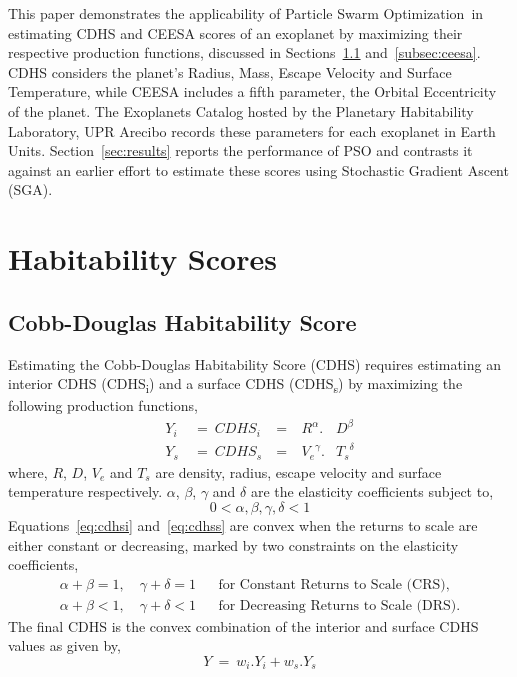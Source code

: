 \documentclass[10pt]{article}
\newcommand{\pso}{Particle Swarm Optimization}
\begin{document}
This paper demonstrates the applicability of \pso\ in estimating CDHS and CEESA scores of an exoplanet by maximizing
their respective production functions, discussed in Sections~\ref{subsec:cdhs} and~\ref{subsec:ceesa}. CDHS considers
the planet's Radius, Mass, Escape Velocity and Surface Temperature, while CEESA includes a fifth parameter, the Orbital
Eccentricity of the planet. The Exoplanets Catalog hosted by the Planetary Habitability Laboratory, UPR Arecibo records
these parameters for each exoplanet in Earth Units. Section~\ref{sec:results} reports the performance of PSO and
contrasts it against an earlier effort to estimate these scores using Stochastic Gradient Ascent (SGA).


\section{Habitability Scores}

\subsection{Cobb-Douglas Habitability Score}\label{subsec:cdhs}
Estimating the Cobb-Douglas Habitability Score (CDHS) requires estimating an interior CDHS (CDHS\textsubscript{i}) and a
surface CDHS (CDHS\textsubscript{s}) by maximizing the following production functions,
\begin{subequations}
  \begin{alignat}{4}
    Y_i\ &=\ {CDHS}_i\ &=&\ R^\alpha.&D^\beta\label{eq:cdhsi}\\
    Y_s\ &=\ {CDHS}_s\ &=&\ {V_e}^\gamma.&{T_s}^\delta\label{eq:cdhss}
  \end{alignat}
\end{subequations}
where, $R$, $D$, $V_e$ and $T_s$ are density, radius, escape velocity and surface temperature respectively. $\alpha$,
$\beta$, $\gamma$ and $\delta$ are the elasticity coefficients subject to,
\begin{equation}
  0 < \alpha,\beta,\gamma,\delta < 1
\end{equation}
Equations~\ref{eq:cdhsi} and~\ref{eq:cdhss} are convex when the returns to scale are either constant or decreasing,
marked by two constraints on the elasticity coefficients,
\begin{subequations}
  \begin{align}
    \alpha+\beta = 1,\quad\gamma+\delta = 1 && \text{for Constant Returns to Scale (CRS),}\\
    \alpha+\beta < 1,\quad\gamma+\delta < 1 && \text{for Decreasing Returns to Scale (DRS).}
  \end{align}
\end{subequations}
The final CDHS is the convex combination of the interior and surface CDHS values as given by,
\begin{equation}
  Y\ =\ w_i.Y_i + w_s.Y_s
\end{equation}
\end{document}
